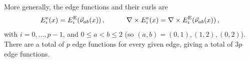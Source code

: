 More generally, the edge functions and their curls are
\begin{equation}
	E_i^\mathrm{e}(x)=E_i^{\mathrm{E}}(\vec{\nu}_{ab}(x))\,,\qquad\quad\nabla\times E_i^\mathrm{e}(x)=\nabla\times E_i^{\mathrm{E}}(\vec{\nu}_{ab}(x))\,,
	\label{eq:TriEgeneral}
\end{equation}
with $i=0,\ldots,p-1$, and $0\leq a<b\leq2$ (so $(a,b)=(0,1),(1,2),(0,2)$). There are a total of $p$ edge functions for every given edge, giving a total of $3p$ edge functions.





